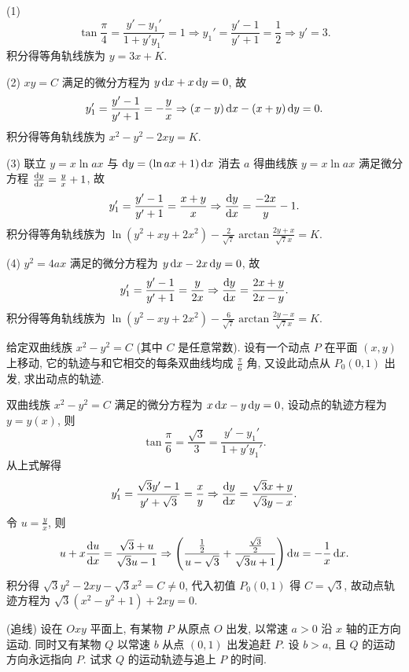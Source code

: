 \begin{solve}
  (1)
  \[\tan\frac{\pi}{4}=\frac{y'-y_1'}{1+y'y_1'}=1\Rightarrow y_1'
    = \frac{y'-1}{y'+1}=\frac{1}{2}\Rightarrow y'=3.\]
  积分得等角轨线族为 $y=3x+K$.

  (2) $xy=C$ 满足的微分方程为 $y\mathop{}\!\mathrm{d} x+x\mathop{}\!\mathrm{d} y=0$, 故
  \[y_1'=\frac{y'-1}{y'+1}=-\frac{y}{x}\Rightarrow(x-y)\mathop{}\!\mathrm{d} x-(x+y)\mathop{}\!\mathrm{d} y=0.\]
  积分得等角轨线族为 $x^2-y^2-2xy=K$.

  (3) 联立 $y=x\ln ax$ 与 $\mathop{}\!\mathrm{d} y=(\ln ax+1)\mathop{}\!\mathrm{d} x$
  消去 $a$ 得曲线族 $y=x\ln ax$ 满足微分方程 $\frac{\mathop{}\!\mathrm{d} y}{\mathop{}\!\mathrm{d} x}=\frac{y}{x}+1$, 故
  \[y_1'=\frac{y'-1}{y'+1}=\frac{x+y}{x}\Rightarrow\frac{\mathop{}\!\mathrm{d} y}{\mathop{}\!\mathrm{d} x}=\frac{-2x}{y}-1.\]
  积分得等角轨线族为 $\ln(y^2+xy+2x^2)-\frac{2}{\sqrt{7}}\arctan\frac{2y+x}{\sqrt{7}x}=K$.

  (4) $y^2=4ax$ 满足的微分方程为 $y\mathop{}\!\mathrm{d} x-2x\mathop{}\!\mathrm{d} y=0$, 故
  \[y_1'=\frac{y'-1}{y'+1}=\frac{y}{2x}\Rightarrow\frac{\mathop{}\!\mathrm{d} y}{\mathop{}\!\mathrm{d} x}=\frac{2x+y}{2x-y}.\]
  积分得等角轨线族为 $\ln(y^2-xy+2x^2)-\frac{6}{\sqrt{7}}\arctan\frac{2y-x}{\sqrt{7}x}=K$.
\end{solve}



\begin{exercise}
  给定双曲线族 $x^2-y^2=C$ (其中 $C$ 是任意常数). 设有一个动点 $P$ 在平面 $(x,y)$ 上移动,
  它的轨迹与和它相交的每条双曲线均成 $\frac{\pi}{6}$ 角, 又设此动点从 $P_0(0,1)$ 出发, 求出动点的轨迹.
\end{exercise}

\begin{solve}
  双曲线族 $x^2-y^2=C$ 满足的微分方程为 $x\mathop{}\!\mathrm{d} x-y\mathop{}\!\mathrm{d} y=0$, 设动点的轨迹方程为 $y=y(x)$, 则
  \[\tan\frac{\pi}{6}=\frac{\sqrt{3}}{3}=\frac{y'-y_1'}{1+y'y_1'}.\]
  从上式解得
  \[y_1'=\frac{\sqrt{3}y'-1}{y'+\sqrt{3}}=\frac{x}{y}
    \Rightarrow\frac{\mathop{}\!\mathrm{d} y}{\mathop{}\!\mathrm{d} x}=\frac{\sqrt{3}x+y}{\sqrt{3}y-x}.\]
  令 $u=\frac{y}{x}$, 则
  \[u+x\frac{\mathop{}\!\mathrm{d} u}{\mathop{}\!\mathrm{d} x}=\frac{\sqrt{3}+u}{\sqrt{3}u-1}
    \Rightarrow\left(\frac{\frac{1}{2}}{u-\sqrt{3}}
      + \frac{\frac{\sqrt{3}}{2}}{\sqrt{3}u+1}\right)\mathop{}\!\mathrm{d} u=-\frac{1}{x}\mathop{}\!\mathrm{d} x.\]
  积分得 $\sqrt{3}y^2-2xy-\sqrt{3}x^2=C\neq 0$, 代入初值 $P_0(0,1)$ 得 $C=\sqrt{3}$,
  故动点轨迹方程为 $\sqrt{3}(x^2-y^2+1)+2xy=0$.
\end{solve}



\begin{exercise}(追线) 
  设在 $Oxy$ 平面上, 有某物 $P$ 从原点 $O$ 出发, 以常速 $a>0$ 沿 $x$ 轴的正方向运动. 
  同时又有某物 $Q$ 以常速 $b$ 从点 $(0,1)$ 出发追赶 $P$. 设 $b>a$, 且 $Q$ 的运动方向永远指向 $P$. 
  试求 $Q$ 的运动轨迹与追上 $P$ 的时间.
\end{exercise}

